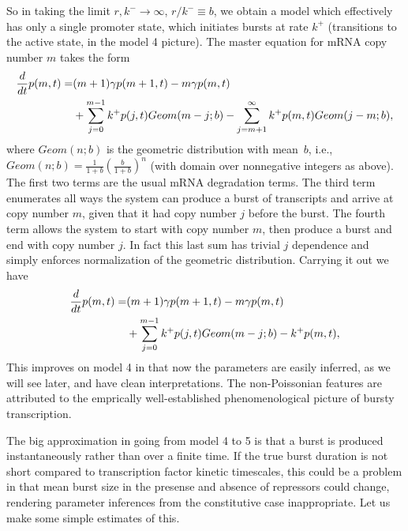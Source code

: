 So in taking the limit $r,k^-\rightarrow\infty$, $r/k^-\equiv b$, we obtain a
model which effectively has only a single promoter state, which initiates bursts
at rate $k^+$ (transitions to the active state, in the model 4 picture). The
master equation for mRNA copy number $m$ takes the form
\begin{align}
\begin{split}
\frac{d {}}{d t}{p(m,t)} = & (m+1)\gamma p(m+1,t) - m\gamma p(m,t) \\
        &+ \sum_{j=0}^{m-1} k^+ p(j,t) Geom(m-j;b)
         - \sum_{j=m+1}^\infty k^+ p(m,t) Geom(j-m;b),
\end{split}
\end{align}
where $Geom(n;b)$ is the geometric distribution with mean~$b$, i.e., $Geom(n;b)
= \frac{1}{1+b}\left(\frac{b}{1+b}\right)^n$ (with domain over nonnegative
integers as above). The first two terms are the usual mRNA degradation terms.
The third term enumerates all ways the system can produce a burst of transcripts
and arrive at copy number $m$, given that it had copy number $j$ before the
burst. The fourth term allows the system to start with copy number $m$, then
produce a burst and end with copy number $j$. In fact this last sum has trivial
$j$ dependence and simply enforces normalization of the geometric distribution.
Carrying it out we have
\begin{equation}
\begin{split}
\frac{d {}}{d t}{p(m,t)} = & (m+1)\gamma p(m+1,t) - m\gamma p(m,t) \\
        &+ \sum_{j=0}^{m-1} k^+ p(j,t) Geom(m-j;b)
            - k^+ p(m,t),
\end{split}
\end{equation}
This improves on model 4 in that now the parameters are easily inferred, as we
will see later, and have clean interpretations. The non-Poissonian features are
attributed to the emprically well-established phenomenological picture of bursty
transcription.

The big approximation in going from model 4 to 5 is that a burst is produced
instantaneously rather than over a finite time. If the true burst duration is
not short compared to transcription factor kinetic timescales, this could be a
problem in that mean burst size in the presense and absence of repressors could
change, rendering parameter inferences from the constitutive case inappropriate.
Let us make some simple estimates of this.

